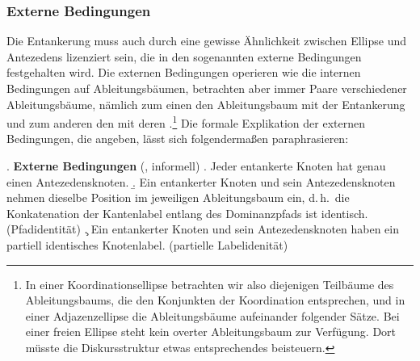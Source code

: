 \subsubsection*{Externe Bedingungen}\label{sec-deanchoring-extern}

Die Entankerung muss auch durch eine gewisse Ähnlichkeit zwischen Ellipse und Antezedens lizenziert sein, die in den sogenannten externe Bedingungen festgehalten wird. Die externen Bedingungen operieren wie die internen Bedingungen auf Ableitungsbäumen, betrachten aber immer Paare verschiedener Ableitungsbäume, nämlich zum einen den Ableitungsbaum mit der Entankerung und zum anderen den  mit deren .\footnote{In einer Koordinationsellipse betrachten wir also diejenigen Teilbäume des Ableitungsbaums, die den Konjunkten der Koordination entsprechen, und in einer Adjazenzellipse die Ableitungsbäume aufeinander folgender Sätze. Bei einer freien Ellipse steht kein overter Ableitungsbaum zur Verfügung. Dort müsste die Diskursstruktur etwas entsprechendes beisteuern.} Die formale Explikation der externen Bedingungen, die \cite{Lichte:Kallmeyer:10} angeben, lässt sich folgenderma\ss en paraphrasieren:

\ex. {\bf Externe Bedingungen} (\citealt{Lichte:Kallmeyer:10}, informell) \label{ex-entankerung-externe-bedingungen}
\a. Jeder entankerte Knoten hat genau einen Antezedensknoten.
\b. Ein entankerter Knoten und sein Antezedensknoten nehmen dieselbe Position im jeweiligen Ableitungsbaum ein, d.\,h.\ die Konkatenation der Kantenlabel entlang des Dominanzpfads ist identisch. (Pfadidentität)
\c. Ein entankerter Knoten und sein Antezedensknoten haben ein partiell identisches Knotenlabel. (partielle Labelidenität)    

